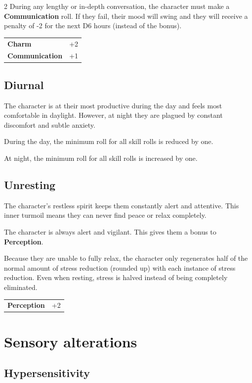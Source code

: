 \begin{multicols}{2}
    During any lengthy or in-depth conversation, the character must make a \textbf{Communication} roll. If they fail, their mood will swing and they will receive a penalty of -2 for the next D6 hours (instead of the bonus).

    \begin{tabular}{@{}ll@{}}
        \textbf{Charm} & +2\\
        \textbf{Communication} & +1\\
    \end{tabular}

    \subsection*{Diurnal}

    The character is at their most productive during the day and feels most comfortable in daylight. However, at night they are plagued by constant discomfort and subtle anxiety.

    During the day, the minimum roll for all skill rolls is reduced by one.

    At night, the minimum roll for all skill rolls is increased by one.


    \subsection*{Unresting}

    The character's restless spirit keeps them constantly alert and attentive. This inner turmoil means they can never find peace or relax completely.

    The character is always alert and vigilant. This gives them a bonus to \textbf{Perception}.

    Because they are unable to fully relax, the character only regenerates half of the normal amount of stress reduction (rounded up) with each instance of stress reduction. Even when resting, stress is halved instead of being completely eliminated.

    \begin{tabular}{@{}ll@{}}
        \textbf{Perception} & +2\\
    \end{tabular}

    \section{Sensory alterations}

    \subsection*{Hypersensitivity}


\end{multicols}
